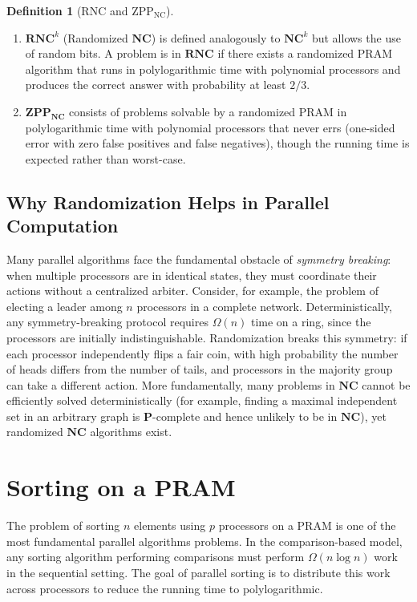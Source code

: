 \documentclass[twoside,12pt]{book}
\theoremstyle{plain}
\theoremstyle{definition}
\newtheorem{definition}[theorem]{Definition}
\theoremstyle{remark}
\begin{document}
\begin{definition}[RNC and ZPP$_{\mathrm{NC}}$]
\label{def:rnc}
\begin{enumerate}[label=(\roman*)]
\item $\mathbf{RNC}^k$ (Randomized $\mathbf{NC}$) is defined analogously to $\mathbf{NC}^k$ but allows the use of random bits. A problem is in $\mathbf{RNC}$ if there exists a randomized PRAM algorithm that runs in polylogarithmic time with polynomial processors and produces the correct answer with probability at least $2/3$.
\item $\mathbf{ZPP_{NC}}$ consists of problems solvable by a randomized PRAM in polylogarithmic time with polynomial processors that never errs (one-sided error with zero false positives and false negatives), though the running time is expected rather than worst-case.
\end{enumerate}
\end{definition}

\subsection{Why Randomization Helps in Parallel Computation}
\label{subsec:why-random-parallel}

Many parallel algorithms face the fundamental obstacle of \emph{symmetry breaking}: when multiple processors are in identical states, they must coordinate their actions without a centralized arbiter. Consider, for example, the problem of electing a leader among $n$ processors in a complete network. Deterministically, any symmetry-breaking protocol requires $\Omega(n)$ time on a ring, since the processors are initially indistinguishable. Randomization breaks this symmetry: if each processor independently flips a fair coin, with high probability the number of heads differs from the number of tails, and processors in the majority group can take a different action. More fundamentally, many problems in $\mathbf{NC}$ cannot be efficiently solved deterministically (for example, finding a maximal independent set in an arbitrary graph is $\mathbf{P}$-complete and hence unlikely to be in $\mathbf{NC}$), yet randomized $\mathbf{NC}$ algorithms exist.

\section{Sorting on a PRAM}
\label{sec:sorting-pram}

The problem of sorting $n$ elements using $p$ processors on a PRAM is one of the most fundamental parallel algorithms problems. In the comparison-based model, any sorting algorithm performing comparisons must perform $\Omega(n \log n)$ work in the sequential setting. The goal of parallel sorting is to distribute this work across processors to reduce the running time to polylogarithmic.
\end{document}
